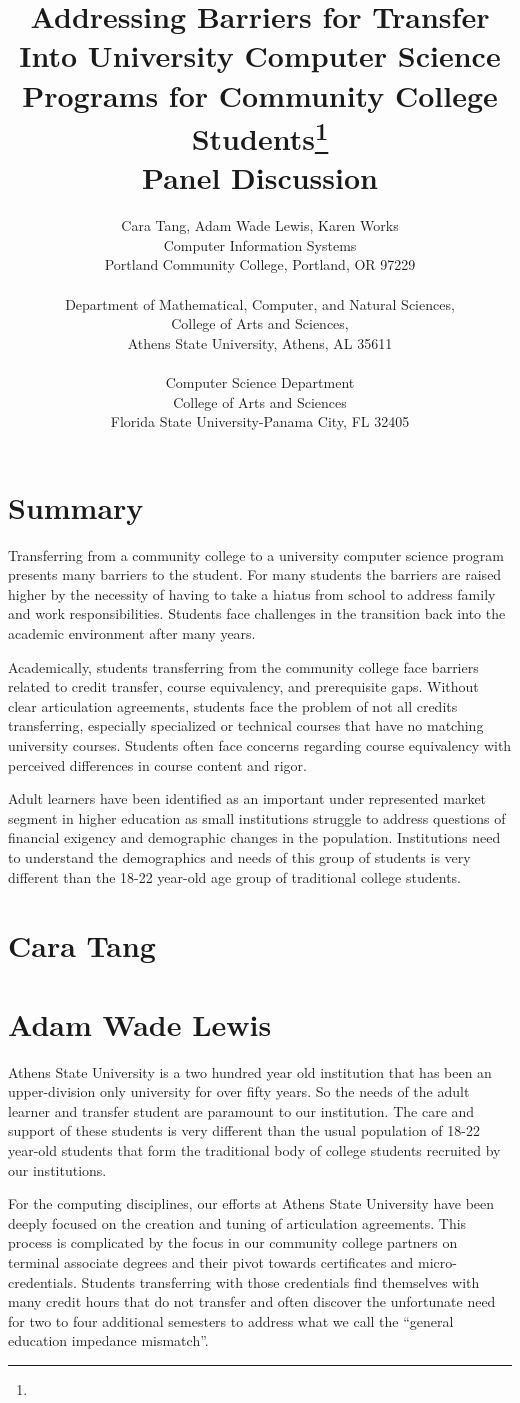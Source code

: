 \documentclass{article}
\title{Addressing Barriers for Transfer Into University Computer Science
  Programs for Community College
  Students\footnote{\protect}
\\
\vspace{0.2in}
\large Panel Discussion
}
\author{
Cara Tang\affmark[1], Adam Wade Lewis\affmark[2], Karen Works\affmark[3]\\
\affmark[1]Computer Information Systems\\
Portland Community College, Portland, OR 97229\\
\email{cara.tang@pcc.edu}\\
\affmark[2]Department of Mathematical, Computer, and Natural Sciences,\\
College of Arts and Sciences,\\
Athens State University, Athens, AL 35611\\
\email{Adam.Lewis@athens.edu}\\
Computer Science Department\\
College of Arts and Sciences\\
Florida State University-Panama City, FL 32405\\
\email{keworks@fsu.edu}
}
\begin{document}
\maketitle

\section{Summary}
Transferring from a community college to a university computer science
program presents many barriers to the student.  For many  students
the barriers are raised higher by the necessity of having to take a
hiatus from school to address family and work responsibilities. Students
face challenges in the transition back into the academic environment
after many years.

Academically, students transferring from the community college face
barriers related to credit transfer, course equivalency, and
prerequisite gaps. Without clear articulation agreements, students face
the problem of not all credits transferring, especially specialized or
technical courses that have no matching university courses. Students
often face concerns regarding course equivalency with perceived
differences in course content and rigor.

Adult learners have been identified as an important under represented  market segment
in higher education as small institutions struggle to address questions
of financial exigency and demographic changes in the population.
Institutions need to understand the demographics and needs of this group
of students is very different than the 18-22 year-old age group of
traditional college students.

\section{Cara Tang}

\section{Adam Wade Lewis}
Athens State University is a two hundred year old institution that has
been an upper-division only university for over fifty years.
So the needs of the adult learner and transfer student are paramount to
our institution.   The care and support of these students is very
different than the usual population of 18-22 year-old students that form
the traditional body of college students recruited by our institutions.

For the computing disciplines, our efforts at Athens State University
have been deeply focused on the creation and tuning of articulation
agreements.  This process is complicated by the focus in our community
college partners on terminal associate degrees and their pivot towards
certificates and micro-credentials.  Students transferring with those
credentials find themselves with many credit hours that do not transfer
and often discover the unfortunate need for two to four additional
semesters to address what we call the ``general education impedance
mismatch''.
\end{document}
